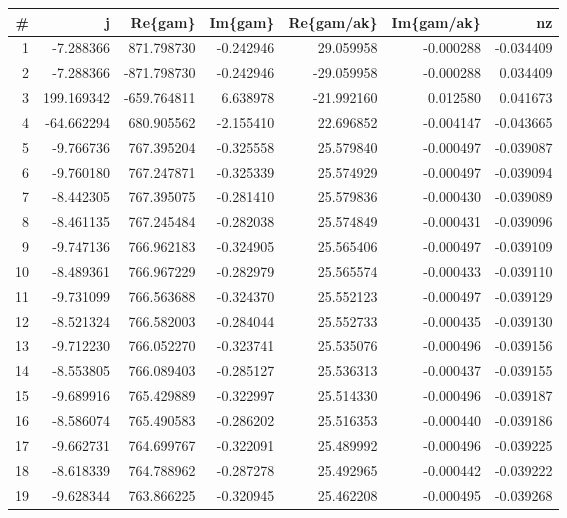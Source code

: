 \begin{tabular}{rrrrrrr}
\toprule
   \# &          j &     Re\{gam\} &   Im\{gam\} &  Re\{gam/ak\} &  Im\{gam/ak\} &        nz \\
\midrule
   1 &  -7.288366 &  871.798730 & -0.242946 &   29.059958 &   -0.000288 & -0.034409 \\
   2 &  -7.288366 & -871.798730 & -0.242946 &  -29.059958 &   -0.000288 &  0.034409 \\
   3 & 199.169342 & -659.764811 &  6.638978 &  -21.992160 &    0.012580 &  0.041673 \\
   4 & -64.662294 &  680.905562 & -2.155410 &   22.696852 &   -0.004147 & -0.043665 \\
   5 &  -9.766736 &  767.395204 & -0.325558 &   25.579840 &   -0.000497 & -0.039087 \\
   6 &  -9.760180 &  767.247871 & -0.325339 &   25.574929 &   -0.000497 & -0.039094 \\
   7 &  -8.442305 &  767.395075 & -0.281410 &   25.579836 &   -0.000430 & -0.039089 \\
   8 &  -8.461135 &  767.245484 & -0.282038 &   25.574849 &   -0.000431 & -0.039096 \\
   9 &  -9.747136 &  766.962183 & -0.324905 &   25.565406 &   -0.000497 & -0.039109 \\
  10 &  -8.489361 &  766.967229 & -0.282979 &   25.565574 &   -0.000433 & -0.039110 \\
  11 &  -9.731099 &  766.563688 & -0.324370 &   25.552123 &   -0.000497 & -0.039129 \\
  12 &  -8.521324 &  766.582003 & -0.284044 &   25.552733 &   -0.000435 & -0.039130 \\
  13 &  -9.712230 &  766.052270 & -0.323741 &   25.535076 &   -0.000496 & -0.039156 \\
  14 &  -8.553805 &  766.089403 & -0.285127 &   25.536313 &   -0.000437 & -0.039155 \\
  15 &  -9.689916 &  765.429889 & -0.322997 &   25.514330 &   -0.000496 & -0.039187 \\
  16 &  -8.586074 &  765.490583 & -0.286202 &   25.516353 &   -0.000440 & -0.039186 \\
  17 &  -9.662731 &  764.699767 & -0.322091 &   25.489992 &   -0.000496 & -0.039225 \\
  18 &  -8.618339 &  764.788962 & -0.287278 &   25.492965 &   -0.000442 & -0.039222 \\
  19 &  -9.628344 &  763.866225 & -0.320945 &   25.462208 &   -0.000495 & -0.039268 \\

\end{tabular}
